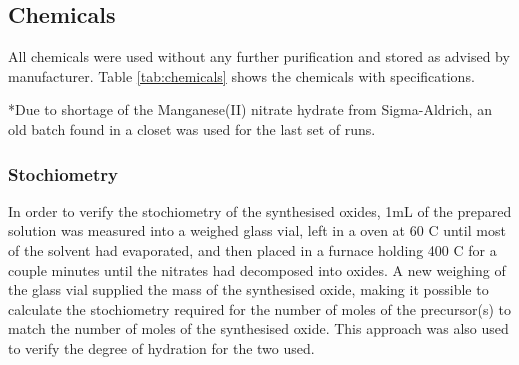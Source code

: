 \documentclass[Main/main.tex]{subfiles}
\begin{document}
\subsection{Chemicals}
All chemicals were used without any further purification and stored as advised by manufacturer. Table \ref{tab:chemicals} shows the chemicals with specifications.

\begin{table}[ht]
	\centering
	\caption{The compounds used as precursors.}
	\label{tab:chemicals}
	    \vspace{1ex} \scriptsize{\raggedright{*Due to shortage of the Manganese(II) nitrate hydrate from Sigma-Aldrich, an old batch found in a closet was used for the last set of runs.}}
	\end{table}


\subsubsection{Stochiometry}

In order to verify the stochiometry of the synthesised oxides, 1mL of the prepared solution was measured into a weighed glass vial, left in a oven at 60 \degree C until most of the solvent had evaporated, and then placed in a furnace holding 400 \degree C for a couple minutes until the nitrates had decomposed into oxides. A new weighing of the glass vial supplied the mass of the synthesised oxide, making it possible to calculate the stochiometry required for the number of moles of the precursor(s) to match the number of moles of the synthesised oxide. This approach was also used to verify the degree of hydration for the two  used.
\end{document}
